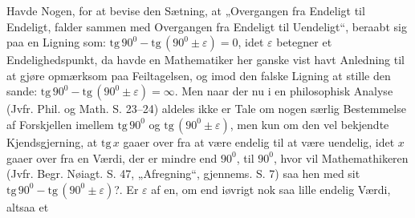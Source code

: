 \documentclass[12pt,a4paper]{book}
\begin{document}
Havde Nogen, for at bevise den Sætning, at „Overgangen
fra Endeligt til Endeligt, falder sammen med Overgangen
fra Endeligt til Uendeligt“, beraabt sig paa en Ligning
som: $\mathrm{tg}\,90^{0} - \mathrm{tg}\,(90^{0} \pm \varepsilon)
= 0$, idet $\varepsilon$ betegner
et Endelighedspunkt, da havde en Mathematiker her
ganske vist havt Anledning til at gjøre opmærksom paa Feiltagelsen,
og imod den falske Ligning at stille den sande:
$\mathrm{tg}\,90^{0} - \mathrm{tg}\,(90^{0} \pm \varepsilon) =
\infty$. Men naar der nu i en
philosophisk Analyse (Jvfr. Phil. og Math. S. 23--24) aldeles
ikke er Tale om nogen særlig Bestemmelse af Forskjellen
imellem $\mathrm{tg}\,90^{0}$ og $\mathrm{tg}\,(90^{0} \pm
\varepsilon)$, men kun om den vel
bekjendte Kjendsgjerning, at $\mathrm{tg}\,x$ gaaer over fra at være
endelig til at være uendelig, idet $x$ gaaer over fra en
Værdi, der er mindre end $90^{0}$, til $90^{0}$, hvor vil Mathemathikeren
(Jvfr. Begr. Nøiagt. S. 47, „Afregning“, gjennems.
S. 7) saa hen med sit $\mathrm{tg}\,90^{0} -
\mathrm{tg}\,(90^{0} \pm \varepsilon)$?. Er $\varepsilon$
af en, om end iøvrigt nok saa lille endelig Værdi, altsaa et
\end{document}
